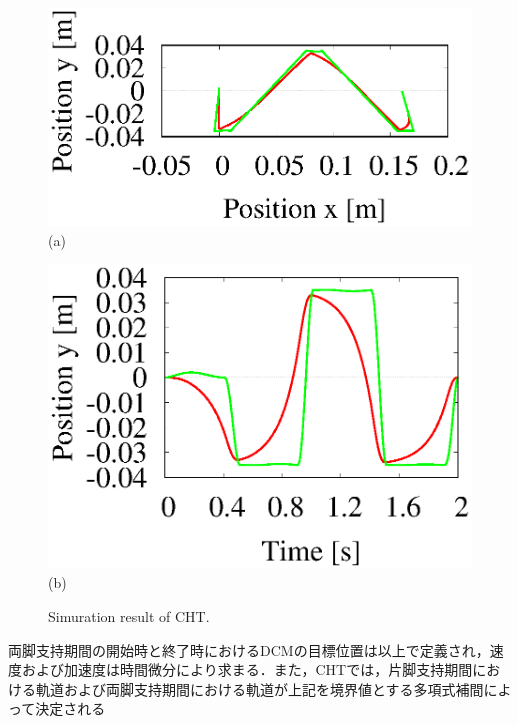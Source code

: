 \documentclass[twocolumn]{jsarticle}
\begin{document}
\begin{figure}[b]
  \begin{minipage}{0.48\linewidth}
    \centering
    \includegraphics[width=1.0\linewidth]{./fig/Position1.eps}
    \footnotesize{\hspace{30pt}(a)}
  \end{minipage}
  \begin{minipage}{0.48\linewidth}
    \centering
    \includegraphics[width=1.0\linewidth]{./fig/rXKIDOU.eps}
    \footnotesize{\hspace{30pt}(b)}
  \end{minipage}
  \caption{Simuration result of CHT.}
  \label{fig:CHT}
\end{figure}
両脚支持期間の開始時と終了時におけるDCMの目標位置は以上で定義され，速度および加速度は時間微分により求まる．また，CHTでは，片脚支持期間における軌道および両脚支持期間における軌道が上記を境界値とする多項式補間によって決定される
\end{document}
